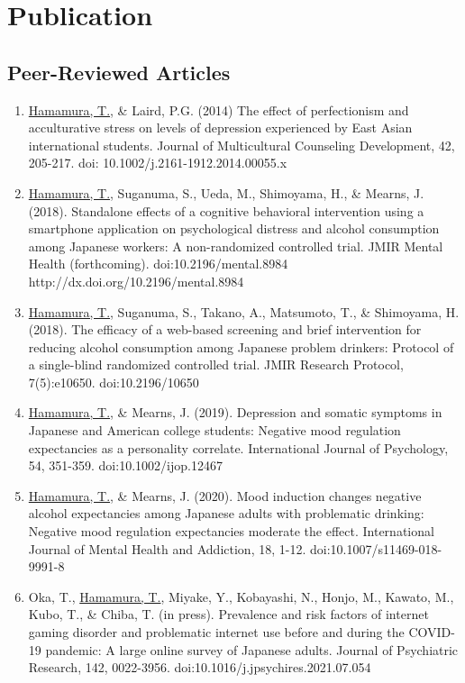 \documentclass{article}
\begin{document}
\section{Publication}
\subsection{Peer-Reviewed Articles}
\begin{enumerate}
	\item \underline{Hamamura, T.}, \& Laird, P.G. (2014) The effect of perfectionism and acculturative stress on levels of depression experienced by East Asian international students. Journal of Multicultural Counseling Development, 42, 205-217. doi: 10.1002/j.2161-1912.2014.00055.x
	\item \underline{Hamamura, T.}, Suganuma, S., Ueda, M., Shimoyama, H., \& Mearns, J. (2018). Standalone effects of a cognitive behavioral intervention using a smartphone application on psychological distress and alcohol consumption among Japanese workers: A non-randomized controlled trial. JMIR Mental Health (forthcoming). doi:10.2196/mental.8984 http://dx.doi.org/10.2196/mental.8984
	\item \underline{Hamamura, T.}, Suganuma, S., Takano, A., Matsumoto, T., \& Shimoyama, H. (2018). The efficacy of a web-based screening and brief intervention for reducing alcohol consumption among Japanese problem drinkers: Protocol of a single-blind randomized controlled trial. JMIR Research Protocol, 7(5):e10650. doi:10.2196/10650
	\item \underline{Hamamura, T.}, \& Mearns, J. (2019). Depression and somatic symptoms in Japanese and American college students: Negative mood regulation expectancies as a personality correlate. International Journal of Psychology, 54, 351-359. doi:10.1002/ijop.12467
	\item \underline{Hamamura, T.}, \& Mearns, J. (2020). Mood induction changes negative alcohol expectancies among Japanese adults with problematic drinking: Negative mood regulation expectancies moderate the effect. International Journal of Mental Health and Addiction, 18, 1-12. doi:10.1007/s11469-018-9991-8
	\item Oka, T., \underline{Hamamura, T.}, Miyake, Y.,  Kobayashi, N., Honjo, M., Kawato, M., Kubo, T., \& Chiba, T. (in press). Prevalence and risk factors of internet gaming disorder and problematic internet use before and during the COVID-19 pandemic: A large online survey of Japanese adults. Journal of Psychiatric Research, 142, 0022-3956. doi:10.1016/j.jpsychires.2021.07.054

\end{enumerate}
\end{document}
